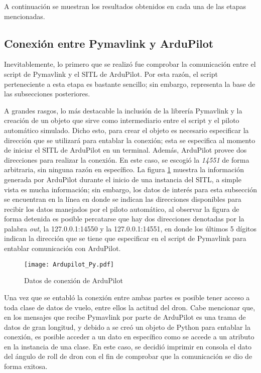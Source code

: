 A continuación se muestran los resultados obtenidos en cada una de las etapas mencionadas. 

\subsection{Conexión entre Pymavlink y ArduPilot}

Inevitablemente, lo primero que se realizó fue comprobar la comunicación entre el script de Pymavlink y el SITL de ArduPilot. Por esta razón, el script perteneciente a esta etapa es bastante sencillo; sin embargo, representa la base de las subsecciones posteriores.

A grandes rasgos, lo más destacable la inclusión de la librería Pymavlink y la creación de un objeto que sirve como intermediario entre el script y el piloto automático simulado. Dicho esto, para crear el objeto es necesario especificar la dirección que se utilizará para entablar la conexión; esta se especifica al momento de iniciar el SITL de ArduPilot en un terminal. Además, ArduPilot provee dos direcciones para realizar la conexión. En este caso, se escogió la \textit{14551} de forma arbitraria, sin ninguna razón en específico. La figura \ref{fig:Ardupilot_Py} muestra la información generada por ArduPilot durante el inicio de una instancia del SITL, a simple vista es mucha información; sin embargo, los datos de interés para esta subsección se encuentran en la línea en donde se indican las direcciones disponibles para recibir los datos manejados por el piloto automático, al observar la figura de forma detenida es posible percatarse que hay dos direcciones denotadas por la palabra \textit{out}, la 127.0.0.1:14550 y la 127.0.0.1:14551, en donde los últimos 5 dígitos indican la dirección que se tiene que especificar en el script de Pymavlink para entablar comunicación con ArduPilot. 

\begin{figure}[ht]
    \centering
    \texttt{[image: Ardupilot\_Py.pdf]}
    \caption{Datos de conexión de ArduPilot}
    \label{fig:Ardupilot_Py}
\end{figure}

Una vez que se entabló la conexión entre ambas partes es posible tener acceso a toda clase de datos de vuelo, entre ellos la actitud del dron. Cabe mencionar que, en los mensajes que recibe Pymavlink por parte de ArduPilot es una trama de datos de gran longitud, y debido a se creó un objeto de Python para entablar la conexión, es posible acceder a un dato en específico como se accede a un atributo en la instancia de una clase. En este caso, se decidió imprimir en consola el dato del ángulo de roll de dron con el fin de comprobar que la comunicación se dio de forma exitosa. 

